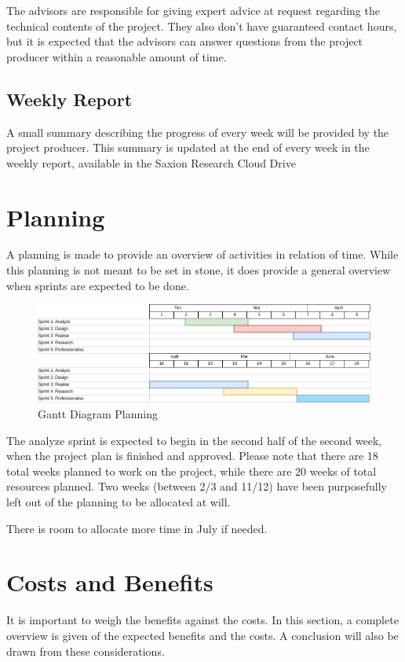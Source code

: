 \documentclass[11pt, a4paper]{article}
\begin{document}
The advisors are responsible for giving expert advice at request regarding the technical contents of the project. They also don't have guaranteed contact hours, but it is expected that the advisors can answer questions from the project producer within a reasonable amount of time.

\subsection{Weekly Report}\label{projectorganization:weeklyreport}
A small summary describing the progress of every week will be provided by the project producer. This summary is updated at the end of every week in the weekly report, available in the Saxion Research Cloud Drive \cite{saxrcd}

\pagebreak

\section{Planning}\label{planning}
A planning is made to provide an overview of activities in relation of time. While this planning is not meant to be set in stone, it does provide a general overview when sprints are expected to be done.

\begin{figure}[h]
    \center
    \includegraphics[width=1.05\textwidth, angle=90]{ganttdiagram.png}
    \caption{Gantt Diagram Planning}
    \label{fig:ganttdiagram}
\end{figure}

The analyze sprint is expected to begin in the second half of the second week, when the project plan is finished and approved. Please note that there are 18 total weeks planned to work on the project, while there are 20 weeks of total resources planned. Two weeks (between 2/3 and 11/12) have been purposefully left out of the planning to be allocated at will. 

There is room to allocate more time in July if needed.
\pagebreak
\section{Costs and Benefits}\label{costsandbenefits}
It is important to weigh the benefits against the costs. In this section, a complete overview is given of the expected benefits and the costs. A conclusion will also be drawn from these considerations.
\end{document}
